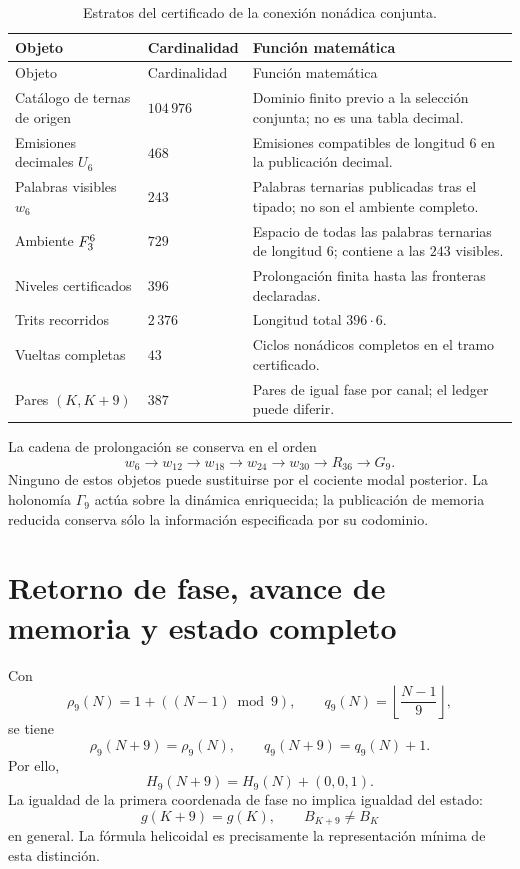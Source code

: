 \begin{longtable}{p{}p{}p{}}
\caption{Estratos del certificado de la conexión nonádica conjunta.}
\label{espiral:tab:certificado-nonadico}\\
\toprule
Objeto&Cardinalidad&Función matemática\\
\midrule
\endfirsthead
\toprule
Objeto&Cardinalidad&Función matemática\\
\midrule
\endhead
Catálogo de ternas de origen&\(104\,976\)&Dominio finito previo a la
selección conjunta; no es una tabla decimal.\\
Emisiones decimales \(U_6\)&\(468\)&Emisiones compatibles de longitud \(6\)
en la publicación decimal.\\
Palabras visibles \(w_6\)&\(243\)&Palabras ternarias publicadas tras el
tipado; no son el ambiente completo.\\
Ambiente \(F_3^6\)&\(729\)&Espacio de todas las palabras ternarias de
longitud \(6\); contiene a las \(243\) visibles.\\
Niveles certificados&\(396\)&Prolongación finita hasta las fronteras
declaradas.\\
Trits recorridos&\(2\,376\)&Longitud total \(396\cdot6\).\\
Vueltas completas&\(43\)&Ciclos nonádicos completos en el tramo
certificado.\\
Pares \((K,K+9)\)&\(387\)&Pares de igual fase por canal; el ledger puede
diferir.\\
\bottomrule
\end{longtable}

La cadena de prolongación se conserva en el orden
\[
 w_6\longrightarrow w_{12}\longrightarrow w_{18}
 \longrightarrow w_{24}\longrightarrow w_{30}
 \longrightarrow R_{36}\longrightarrow G_9.
\]
Ninguno de estos objetos puede sustituirse por el cociente modal posterior.
La holonomía \(\Gamma_9\) actúa sobre la dinámica enriquecida; la
publicación de memoria reducida conserva sólo la información especificada
por su codominio.

\section{Retorno de fase, avance de memoria y estado completo}

Con
\[
 \rho_9(N)=1+((N-1)\bmod9),
 \qquad
 q_9(N)=\left\lfloor\frac{N-1}{9}\right\rfloor,
\]
se tiene
\[
 \rho_9(N+9)=\rho_9(N),
 \qquad q_9(N+9)=q_9(N)+1.
\]
Por ello,
\[
 H_9(N+9)=H_9(N)+(0,0,1).
\]
La igualdad de la primera coordenada de fase no implica igualdad del estado:
\[
 g(K+9)=g(K),
 \qquad B_{K+9}\neq B_K
\]
en general. La fórmula helicoidal es precisamente la representación mínima
de esta distinción.

